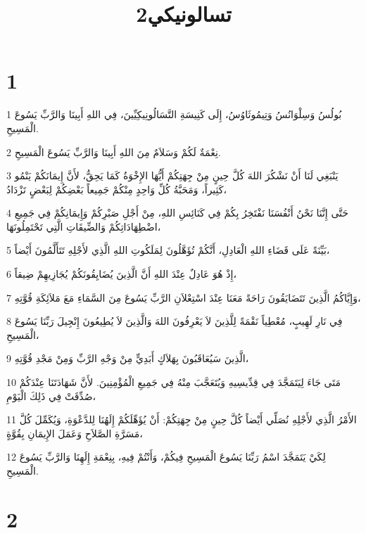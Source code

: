 

\title{2تسالونيكي}


\chapter{1}

\par 1 بُولُسُ وَسِلْوَانُسُ وَتِيمُوثَاوُسُ، إِلَى كَنِيسَةِ التَّسَالُونِيكِيِّينَ، فِي اللهِ أَبِينَا وَالرَّبِّ يَسُوعَ الْمَسِيحِ.
\par 2 نِعْمَةٌ لَكُمْ وَسَلاَمٌ مِنَ اللهِ أَبِينَا وَالرَّبِّ يَسُوعَ الْمَسِيحِ.
\par 3 يَنْبَغِي لَنَا أَنْ نَشْكُرَ اللهَ كُلَّ حِينٍ مِنْ جِهَتِكُمْ أَيُّهَا الإِخْوَةُ كَمَا يَحِقُّ، لأَنَّ إِيمَانَكُمْ يَنْمُو كَثِيراً، وَمَحَبَّةُ كُلِّ وَاحِدٍ مِنْكُمْ جَمِيعاً بَعْضِكُمْ لِبَعْضٍ تَزْدَادُ،
\par 4 حَتَّى إِنَّنَا نَحْنُ أَنْفُسَنَا نَفْتَخِرُ بِكُمْ فِي كَنَائِسِ اللهِ، مِنْ أَجْلِ صَبْرِكُمْ وَإِيمَانِكُمْ فِي جَمِيعِ اضْطِهَادَاتِكُمْ وَالضِّيقَاتِ الَّتِي تَحْتَمِلُونَهَا،
\par 5 بَيِّنَةً عَلَى قَضَاءِ اللهِ الْعَادِلِ، أَنَّكُمْ تُؤَهَّلُونَ لِمَلَكُوتِ اللهِ الَّذِي لأَجْلِهِ تَتَأَلَّمُونَ أَيْضاً،
\par 6 إِذْ هُوَ عَادِلٌ عِنْدَ اللهِ أَنَّ الَّذِينَ يُضَايِقُونَكُمْ يُجَازِيهِمْ ضِيقاً،
\par 7 وَإِيَّاكُمُ الَّذِينَ تَتَضَايَقُونَ رَاحَةً مَعَنَا عِنْدَ اسْتِعْلاَنِ الرَّبِّ يَسُوعَ مِنَ السَّمَاءِ مَعَ مَلاَئِكَةِ قُوَّتِهِ،
\par 8 فِي نَارِ لَهِيبٍ، مُعْطِياً نَقْمَةً لِلَّذِينَ لاَ يَعْرِفُونَ اللهَ وَالَّذِينَ لاَ يُطِيعُونَ إِنْجِيلَ رَبِّنَا يَسُوعَ الْمَسِيحِ،
\par 9 الَّذِينَ سَيُعَاقَبُونَ بِهَلاَكٍ أَبَدِيٍّ مِنْ وَجْهِ الرَّبِّ وَمِنْ مَجْدِ قُوَّتِهِ،
\par 10 مَتَى جَاءَ لِيَتَمَجَّدَ فِي قِدِّيسِيهِ وَيُتَعَجَّبَ مِنْهُ فِي جَمِيعِ الْمُؤْمِنِينَ. لأَنَّ شَهَادَتَنَا عِنْدَكُمْ صُدِّقَتْ فِي ذَلِكَ الْيَوْمِ،
\par 11 الأَمْرُ الَّذِي لأَجْلِهِ نُصَلِّي أَيْضاً كُلَّ حِينٍ مِنْ جِهَتِكُمْ: أَنْ يُؤَهِّلَكُمْ إِلَهُنَا لِلدَّعْوَةِ، وَيُكَمِّلَ كُلَّ مَسَرَّةِ الصَّلاَحِ وَعَمَلَ الإِيمَانِ بِقُوَّةٍ،
\par 12 لِكَيْ يَتَمَجَّدَ اسْمُ رَبِّنَا يَسُوعَ الْمَسِيحِ فِيكُمْ، وَأَنْتُمْ فِيهِ، بِنِعْمَةِ إِلَهِنَا وَالرَّبِّ يَسُوعَ الْمَسِيحِ.

\chapter{2}


